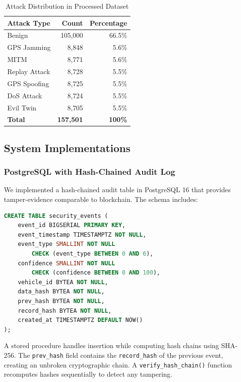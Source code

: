 \documentclass[conference]{IEEEtran}
\begin{document}
\begin{table}[htbp]
\caption{Attack Distribution in Processed Dataset}
\label{tab:attack_distribution}
\centering
\begin{tabular}{lrr}
\toprule
\textbf{Attack Type} & \textbf{Count} & \textbf{Percentage} \\
\midrule
Benign & 105,000 & 66.5\% \\
GPS Jamming & 8,848 & 5.6\% \\
MITM & 8,771 & 5.6\% \\
Replay Attack & 8,728 & 5.5\% \\
GPS Spoofing & 8,725 & 5.5\% \\
DoS Attack & 8,724 & 5.5\% \\
Evil Twin & 8,705 & 5.5\% \\
\midrule
\textbf{Total} & \textbf{157,501} & \textbf{100\%} \\
\bottomrule
\end{tabular}
\end{table}

\subsection{System Implementations}

\subsubsection{PostgreSQL with Hash-Chained Audit Log}

We implemented a hash-chained audit table in PostgreSQL 16 that provides tamper-evidence comparable to blockchain. The schema includes:

\begin{lstlisting}[language=SQL, caption={PostgreSQL Schema (excerpt)}]
CREATE TABLE security_events (
    event_id BIGSERIAL PRIMARY KEY,
    event_timestamp TIMESTAMPTZ NOT NULL,
    event_type SMALLINT NOT NULL
        CHECK (event_type BETWEEN 0 AND 6),
    confidence SMALLINT NOT NULL
        CHECK (confidence BETWEEN 0 AND 100),
    vehicle_id BYTEA NOT NULL,
    data_hash BYTEA NOT NULL,
    prev_hash BYTEA NOT NULL,
    record_hash BYTEA NOT NULL,
    created_at TIMESTAMPTZ DEFAULT NOW()
);
\end{lstlisting}

A stored procedure handles insertion while computing hash chains using SHA-256. The \texttt{prev\_hash} field contains the \texttt{record\_hash} of the previous event, creating an unbroken cryptographic chain. A \texttt{verify\_hash\_chain()} function recomputes hashes sequentially to detect any tampering.
\end{document}
